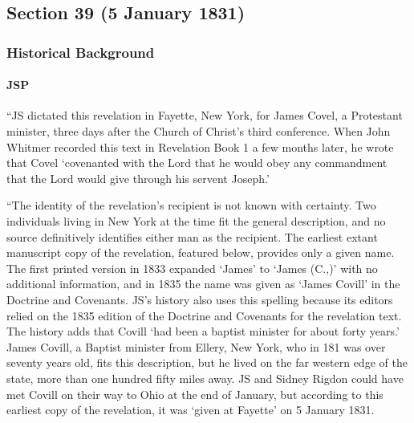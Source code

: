 \subsection{Section 39 (5 January 1831)}
	\label{DC39}
	
	\subsubsection{Historical Background}
		\label{DC39-HB}
		
		\paragraph{JSP}
		
			``JS dictated this revelation in Fayette, New York, for James Covel, a Protestant minister, three days after the Church of Christ's third conference. When John Whitmer recorded this text in Revelation Book 1 a few months later, he wrote that Covel `covenanted with the Lord that he would obey any commandment that the Lord would give through his servent Joseph.'
			
			``The identity of the revelation's recipient is not known with certainty. Two individuals living in New York at the time fit the general description, and no source definitively identifies either man as the recipient. The earliest extant manuscript copy of the revelation, featured below, provides only a given name. The first printed version in 1833 expanded `James' to `James (C.,)' with no additional information, and in 1835 the name was given as `James Covill' in the Doctrine and Covenants. JS's history also uses this spelling because its editors relied on the 1835 edition of the Doctrine and Covenants for the revelation text. The history adds that Covill `had been a baptist minister for about forty years.' James Covill, a Baptist minister from Ellery, New York, who in 181 was over seventy years old, fits this description, but he lived on the far western edge of the state, more than one hundred fifty miles away. JS and Sidney Rigdon could have met Covill on their way to Ohio at the end of January, but according to this earliest copy of the revelation, it was `given at Fayette' on 5 January 1831.
			
